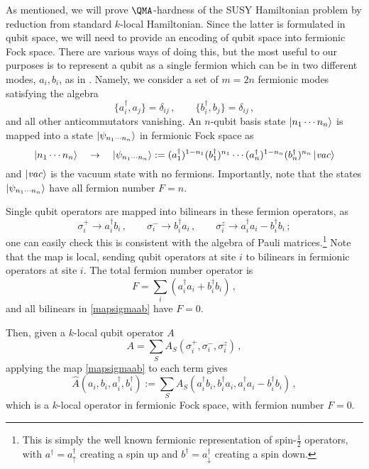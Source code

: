 \documentclass[11pt]{article}
\numberwithin{equation}{section}
\newcommand\equ[1] {\begin{equation}#1\end{equation}}
\renewcommand\( {\left(}
\renewcommand\) {\right)}
\begin{document}
\noindent As mentioned, we will prove $\QMA$-hardness of the SUSY Hamiltonian problem by reduction from  standard {\sc  $k$-local Hamiltonian}. Since the latter is formulated in qubit space, we will need to provide an encoding of qubit space into fermionic Fock space. There are various ways of doing this, but the most useful to our purposes is to represent a qubit as a single fermion which can be in two different modes, $a_{i},b_{i}$, as in \cite{Liu_2007}. 
Namely, we consider a set of $m=2n$ fermionic modes satisfying the algebra
\equ{\label{basisfN}
\{a_{i}^{\dagger},a_{j}\}=\delta_{ij}\,,\qquad \{b_{i}^{\dagger},b_{j}\}=\delta_{ij}\,,
}
and all other anticommutators vanishing. An $n$-qubit basis state $\ket{n_{1}\cdots n_{n}}$ is mapped into a state $ \ket{\psi_{n_{1}\cdots n_{n}}}$ in fermionic Fock space  as
\equ{\label{basisfN}
\ket{n_{1}\cdots n_{n}}\quad \to \quad \ket{\psi_{n_{1}\cdots n_{n}}}:= (a_{1}^{\dagger})^{1-n_{1}}(b_{1}^{\dagger})^{n_{1}}\cdots  (a_{n}^{\dagger})^{1-n_{n}}(b_{n}^{\dagger})^{n_{n}}\ket{\mathit{vac}}
}
and $\ket{\mathit{vac}}$ is the vacuum state with no fermions. Importantly, note that the states $ \ket{\psi_{n_{1}\cdots n_{n}}}$ have all fermion number $F=n$. 

Single qubit operators are mapped into bilinears in these fermion operators, as
\equ{\label{mapsigmaab}
\sigma_{i}^{+}\to a_{i}^{\dagger} b_{i}\,,\qquad \sigma_{i}^{-}\to b_{i}^{\dagger} a_{i}\,,\qquad  \sigma_{i}^{z}\to  a_{i}^{\dagger} a_{i}-b_{i}^{\dagger} b_{i}\,;
} 
one can easily check this is consistent with the algebra of Pauli matrices.\footnote{This is simply the well known fermionic representation of spin-$\tfrac12$ operators, with $a^{\dagger}=a^{\dagger}_{\uparrow}$ creating a spin up and $b^{\dagger}=a^{\dagger}_{\downarrow}$ creating a spin down.} Note that the map is local, sending qubit operators at site $i$ to bilinears in fermionic operators at site $i$. The total fermion number operator is  
\equ{
F= \sum_{i}(a_{i}^{\dagger} a_{i}+b_{i}^{\dagger} b_{i})\,,
} 
and all bilinears in \eqref{mapsigmaab} have $F=0$. 

Then, given a $k$-local qubit operator $A$
\equ{
 A=\sum_{S}A_S(\sigma_i^{+},\sigma_i^{-},\sigma_i^{z})\,,
}
applying the map \eqref{mapsigmaab} to each term gives 
\equ{
\hat A(a_i,b_i,a_i^{\dagger},b_i^{\dagger}):= \sum_{S}A_S(a_i^{\dagger}b_i,b_i^{\dagger}a_i,a_i^{\dagger}a_i-b_i^{\dagger}b_i)\,,
}
which is a $k$-local operator in fermionic Fock space, with fermion number $F=0$.
\end{document}
